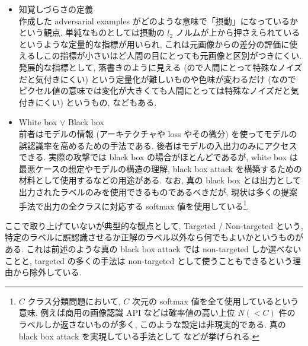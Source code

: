 \begin{itemize}
{  physical attack では対象物のみに摂動を加え, その摂動を含む対象物がどのように撮影されようとも誤認識させるようにする必要がある.
  }
  が, digital attack でも対象物のみに摂動を付与する工夫をしてその後の physical attack につなげようとする手法も存在する.
  \item 知覚しづらさの定義\\
  作成した adversarial examples がどのような意味で「摂動」になっているかという観点.
  単純なものとしては摂動の $l_2$ ノルムが上から押さえられているというような定量的な指標が用いられ, これは元画像からの差分の評価に使えるしこの指標が小さいほど人間の目にとっても元画像と区別がつきにくい.
  発展的な指標として, 落書きのように見える (ので人間にとって特殊なノイズだと気付きにくい) という定量化が難しいものや色味が変わるだけ (なのでピクセル値の意味では変化が大きくても人間にとっては特殊なノイズだと気付きにくい) というもの, などもある.
  \item White box $\lor$ Black box\\
  前者はモデルの情報 (アーキテクチャや loss やその微分) を使ってモデルの誤認識率を高めるための手法である.
  後者はモデルの入出力のみにアクセスできる.
  実際の攻撃では black box の場合がほとんどであるが, white box は最悪ケースの想定やモデルの構造の理解, black box attack を構築するための材料として使用するなどの用途がある.
  なお, 真の black box とは出力として出力されたラベルのみを使用できるものであるべきだが, 現状は多くの提案手法で出力の全クラスに対応する softmax 値を使用している\footnote{
  $C$ クラス分類問題において, $C$ 次元の softmax 値を全て使用しているという意味.
  例えば商用の画像認識 API などは確率値の高い上位 $N (< C)$ 件のラベルしか返さないものが多く, このような設定は非現実的である.
  真の black box attack を実現している手法として \cite{tsuzuku2019structural} などが挙げられる.
  }.
\end{itemize}
%

ここで取り上げていないが典型的な観点として, Targeted / Non-targeted という, 特定のラベルに誤認識させるか正解のラベル以外なら何でもよいかというものがある.
これは前述のような真の black box attack では non-targeted しか選べないことと, targeted の多くの手法は non-targeted として使うこともできるという理由から除外している.

